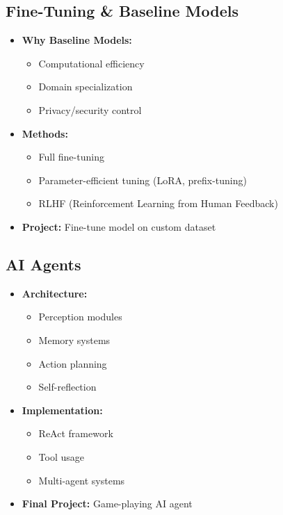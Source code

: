 \documentclass{article}
\begin{document}
\subsection{Fine-Tuning \& Baseline Models}
\begin{itemize}
\item \textbf{Why Baseline Models:}
    \begin{itemize}
    \item Computational efficiency
    \item Domain specialization
    \item Privacy/security control
    \end{itemize}
    
\item \textbf{Methods:}
    \begin{itemize}
    \item Full fine-tuning
    \item Parameter-efficient tuning (LoRA, prefix-tuning)
    \item RLHF (Reinforcement Learning from Human Feedback)
    \end{itemize}
    
\item \textbf{Project:} Fine-tune model on custom dataset
\end{itemize}

\subsection{AI Agents}
\begin{itemize}
\item \textbf{Architecture:}
    \begin{itemize}
    \item Perception modules
    \item Memory systems
    \item Action planning
    \item Self-reflection
    \end{itemize}
    
\item \textbf{Implementation:}
    \begin{itemize}
    \item ReAct framework
    \item Tool usage
    \item Multi-agent systems
    \end{itemize}
    
\item \textbf{Final Project:} Game-playing AI agent
\end{itemize}
\end{document}
